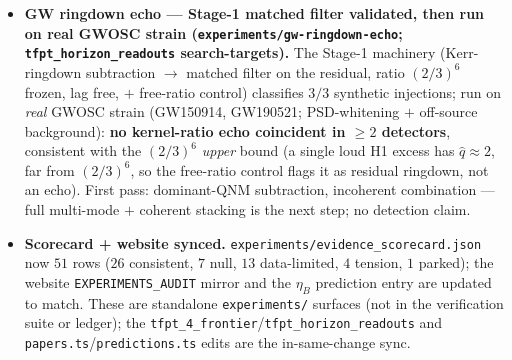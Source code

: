 \documentclass[11pt]{article}
\providecommand{\vref}[1]{\texttt{#1}}
\begin{document}
\begin{itemize}
{  (\texttt{experiments/recovery-channel}; \texttt{tfpt\_horizon\_readouts}, \mC; companion to \vref{v221}).}
  The gapped transport contracts to a \emph{rank-one} projector at exactly $\|T^n-P_\infty\|=(2/3)^{6n}$ ---
  the one-dimensional baby-universe Hilbert space (Engelhardt 2025) --- and the explicit Petz map is CPTP,
  recovers the reference, and equals the identity only on the protected $\lambda{=}1$ (Knill--Laflamme) mode;
  free-ratio and degenerate-spectrum negative controls hold. So the Petz identification \vref{v221} deferred is
  now verified at the channel level (\texttt{internal\_consistency}, no new datum); the full holographic
  reading stays gated on the Seam--Horizon theorem.
\item \textbf{GW ringdown echo --- Stage-1 matched filter validated, then run on real GWOSC strain
  (\texttt{experiments/gw-ringdown-echo}; \texttt{tfpt\_horizon\_readouts} search-targets).} The Stage-1
  machinery (Kerr-ringdown subtraction $\to$ matched filter on the residual, ratio $(2/3)^6$ frozen, lag free,
  $+$ free-ratio control) classifies $3/3$ synthetic injections; run on \emph{real} GWOSC strain
  (GW150914, GW190521; PSD-whitening $+$ off-source background): \textbf{no kernel-ratio echo coincident in
  $\ge2$ detectors}, consistent with the $(2/3)^6$ \emph{upper} bound (a single loud H1 excess has
  $\hat q\approx2$, far from $(2/3)^6$, so the free-ratio control flags it as residual ringdown, not an echo).
  First pass: dominant-QNM subtraction, incoherent combination --- full multi-mode $+$ coherent stacking is the
  next step; no detection claim.
\item \textbf{Scorecard + website synced.} \texttt{experiments/evidence\_scorecard.json} now $51$ rows
  ($26$ consistent, $7$ null, $13$ data-limited, $4$ tension, $1$ parked); the website
  \texttt{EXPERIMENTS\_AUDIT} mirror and the $\eta_B$ prediction entry are updated to match. These are
  standalone \texttt{experiments/} surfaces (not in the verification suite or ledger); the
  \texttt{tfpt\_4\_frontier}/\texttt{tfpt\_horizon\_readouts} and \texttt{papers.ts}/\texttt{predictions.ts}
  edits are the in-same-change sync.
\end{itemize}
\end{document}
